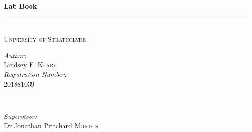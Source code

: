 \documentclass[12pt,oneside]{book}
\begin{document}
\begin{titlepage}

\newcommand{\HRule}{\rule{\linewidth}{0.5mm}} 




\vspace*{3cm} %






\centering
{ \huge \bfseries Lab Book}\\[0.5cm] %
\HRule \\[1cm]
\textsc{\large University of Strathclyde}\\[0.5cm] %

\begin{minipage}{0.4\textwidth}
\begin{flushleft} \large
\emph{Author:}\\
Lindsey F. \textsc{Keary}\\[0.5cm] 
\emph{Registration Number:} \\
201881039 
\end{flushleft}
\end{minipage}
~
\begin{minipage}{0.4\textwidth}
\begin{flushright} \large
\emph{Supervisor:} \\
Dr Jonathan Pritchard \textsc{Morton} \\[0.5cm]
\end{flushright}
\end{minipage}\\[1cm]



\end{titlepage}
\end{document}

